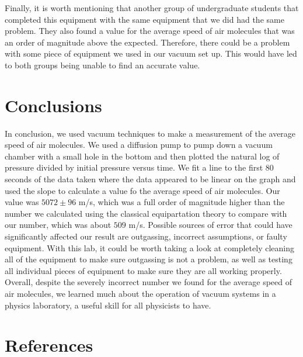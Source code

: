 \documentclass[11pt,letterpaper]{article}
\begin{document}
Finally, it is worth mentioning that another group of undergraduate students that completed this equipment with the same equipment that we did had the same problem. They also found a value for the average speed of air molecules that was an order of magnitude above the expected. Therefore, there could be a problem with some piece of equipment we used in our vacuum set up. This would have led to both groups being unable to find an accurate value.


\section{Conclusions}

In conclusion, we used vacuum techniques to make a measurement of the average speed of air molecules. We used a diffusion pump to pump down a vacuum chamber with a small hole in the bottom and then plotted the natural log of pressure divided by initial pressure versus time. We fit a line to the first 80 seconds of the data taken where the data appeared to be linear on the graph and used the slope to calculate a value fo the average speed of air molecules. Our value was $5072 \pm 96$ m/s, which was a full order of magnitude higher than the number we calculated using the classical equipartation theory to compare with our number, which was about $509$ m/s. Possible sources of error that could have significantly affected our result are outgassing, incorrect assumptions, or faulty equipment. With this lab, it could be worth taking a look at completely cleaning all of the equipment to make sure outgassing is not a problem, as well as testing all individual pieces of equipment to make sure they are all working properly. Overall, despite the severely incorrect number we found for the average speed of air molecules, we learned much about the operation of vacuum systems in a physics laboratory, a useful skill for all physicists to have.


\section{References}
\end{document}
